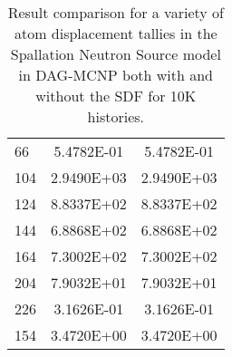 \begin{table}[H]
\begin{center}
\begin{tabular}{lcc}
        66           & 5.4782E-01 & 5.4782E-01        \\
        104          & 2.9490E+03 & 2.9490E+03        \\
        124          & 8.8337E+02 & 8.8337E+02        \\
        144          & 6.8868E+02 & 6.8868E+02        \\
        164          & 7.3002E+02 & 7.3002E+02        \\
        204          & 7.9032E+01 & 7.9032E+01        \\
        226          & 3.1626E-01 & 3.1626E-01        \\
        154          & 3.4720E+00 & 3.4720E+00        \\
        \bottomrule
      \end{tabular}
      \caption[Results of tally values in SNS for various DAG-MNP
        implementations.]{Result comparison for a variety of atom displacement
        tallies in the Spallation Neutron Source model in DAG-MCNP both with and
        without the SDF for 10K histories.}
    \end{center}
  \end{table}
